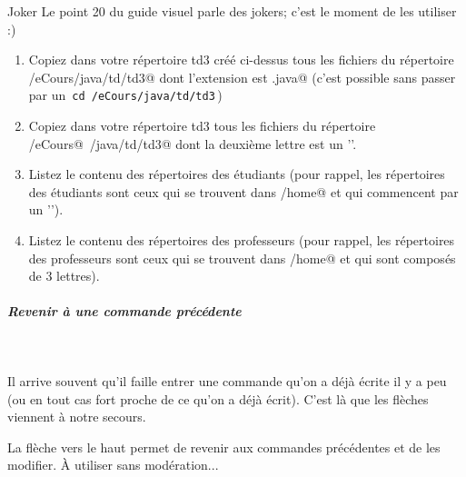 \documentclass[a4paper,11pt]{article}
\begin{document}
		\begin{Exercice}{Joker} 
			Le point 20 du guide visuel parle des jokers; c'est le moment de les utiliser :) 
			\par
			\begin{enumerate}
				\item Copiez dans votre r\'epertoire td3 cr\'e\'e ci-dessus tous les fichiers du r\'epertoire \verb@/eCours/java/td/td3@ dont l'extension est \verb@.java@ 
				(c'est possible sans passer par un \,\verb|cd /eCours/java/td/td3|\,)
          		
            			\item Copiez dans votre r\'epertoire td3 tous les fichiers du r\'epertoire  \verb@/eCours@\ \verb@/java/td/td3@ dont la deuxi\`eme lettre est un '\verb@x@'.
 
 		      		\item  Listez le contenu des r\'epertoires des \'etudiants (pour rappel, les r\'epertoires des \'etudiants sont ceux qui se trouvent dans \verb@/home@ et qui 						commencent par un '\verb@g@').
         			\item Listez le contenu des r\'epertoires des professeurs (pour rappel, les r\'epertoires des professeurs sont ceux qui se trouvent dans \verb@/home@ et qui 						sont compos\'es de 3 lettres).
          		\end{enumerate}
		\end{Exercice}
				
			
		\subparagraph{Revenir \`a une commande pr\'ec\'edente} 
		
			\textcolor{white}{.} \par
			Il arrive souvent qu'il faille entrer une commande qu'on a d\'ej\`a \'ecrite il y a peu (ou en tout cas fort proche de ce qu'on a d\'ej\`a \'ecrit). 
          		C'est l\`a que les fl\`eches viennent \`a notre secours.  
        
           		 \par
          
          		La fl\`eche vers le haut permet de revenir aux commandes pr\'ec\'edentes et de les modifier. \`A utiliser sans mod\'eration...  
        
            		\par
\end{document}
